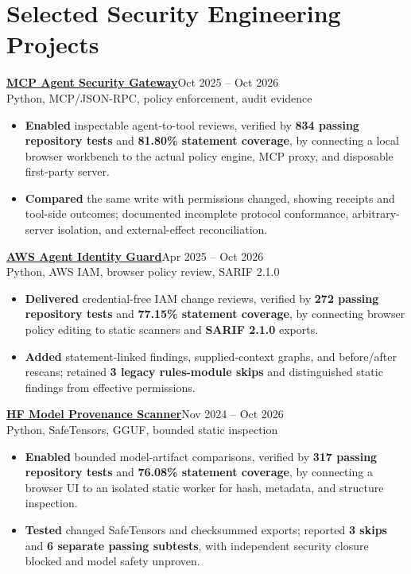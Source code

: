 \documentclass[letterpaper,10pt]{article}
\newcommand{\proj}[3]{\noindent\textbf{#1}\hfill{\fontsize{10}{12}\selectfont #3}\\{\fontsize{10}{12}\selectfont #2}\vspace{1.5pt}}
\begin{document}
\newpage
{}\vspace{1pt}

\section{Selected Security Engineering Projects}
\proj{\href{https://github.com/poojakira/mcp-agent-security-gateway/blob/4f83f01a3ed8aca5639143fe2179afb0f864f46e/release-evidence/RELEASE_ASSESSMENT.md}{MCP Agent Security Gateway}}{Python, MCP/JSON-RPC, policy enforcement, audit evidence}{Oct 2025 -- Oct 2026}
\begin{itemize}
\item \textbf{Enabled} inspectable agent-to-tool reviews, verified by \textbf{834 passing repository tests} and \textbf{81.80\% statement coverage}, by connecting a local browser workbench to the actual policy engine, MCP proxy, and disposable first-party server.
\item \textbf{Compared} the same write with permissions changed, showing receipts and tool-side outcomes; documented incomplete protocol conformance, arbitrary-server isolation, and external-effect reconciliation.
\end{itemize}

\proj{\href{https://github.com/poojakira/aws-agent-identity-guard/blob/a396433a4070a0ddc68aa83f9b1093e87fc3224f/release-evidence/RELEASE_ASSESSMENT.md}{AWS Agent Identity Guard}}{Python, AWS IAM, browser policy review, SARIF 2.1.0}{Apr 2025 -- Oct 2026}
\begin{itemize}
\item \textbf{Delivered} credential-free IAM change reviews, verified by \textbf{272 passing repository tests} and \textbf{77.15\% statement coverage}, by connecting browser policy editing to static scanners and \textbf{SARIF 2.1.0} exports.
\item \textbf{Added} statement-linked findings, supplied-context graphs, and before/after rescans; retained \textbf{3 legacy rules-module skips} and distinguished static findings from effective permissions.
\end{itemize}


\proj{\href{https://github.com/poojakira/hf-model-provenance-scanner/blob/ed25d66b72e374f86e2975930b0ed83b9acf3c09/release-evidence/RELEASE_ASSESSMENT.md}{HF Model Provenance Scanner}}{Python, SafeTensors, GGUF, bounded static inspection}{Nov 2024 -- Oct 2026}
\begin{itemize}
\item \textbf{Enabled} bounded model-artifact comparisons, verified by \textbf{317 passing repository tests} and \textbf{76.08\% statement coverage}, by connecting a browser UI to an isolated static worker for hash, metadata, and structure inspection.
\item \textbf{Tested} changed SafeTensors and checksummed exports; reported \textbf{3 skips} and \textbf{6 separate passing subtests}, with independent security closure blocked and model safety unproven.
\end{itemize}
\end{document}
